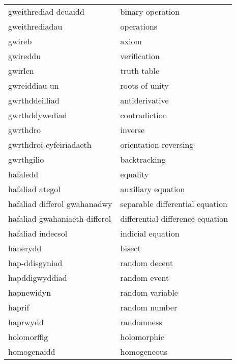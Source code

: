 \begin{supertabular}{p{0.22\textwidth}p{0.22\textwidth}}
           gweithrediad deuaidd &                 binary operation \\
                 gweithrediadau &                       operations \\
                         gwireb &                            axiom \\
                       gwireddu &                     verification \\
                        gwirlen &                      truth table \\
                  gwreiddiau un &                   roots of unity \\
                 gwrthddeilliad &                   antiderivative \\
                 gwrthddywediad &                    contradiction \\
                       gwrthdro &                          inverse \\
        gwrthdroi-cyfeiriadaeth &            orientation-reversing \\
                     gwrthgilio &                     backtracking \\
                       hafaledd &                         equality \\
                hafaliad ategol &               auxiliary equation \\
   hafaliad differol gwahanadwy &  separable differential equation \\
  hafaliad gwahaniaeth-differol & differential-difference equation \\
              hafaliad indecsol &                indicial equation \\
                       hanerydd &                           bisect \\
                 hap-ddisgyniad &                    random decent \\
                 hapddigwyddiad &                     random event \\
                     hapnewidyn &                  random variable \\
                         haprif &                    random number \\
                       haprwydd &                       randomness \\
                    holomorffig &                      holomorphic \\
                    homogenaidd &                      homogeneous \\

\end{supertabular}
